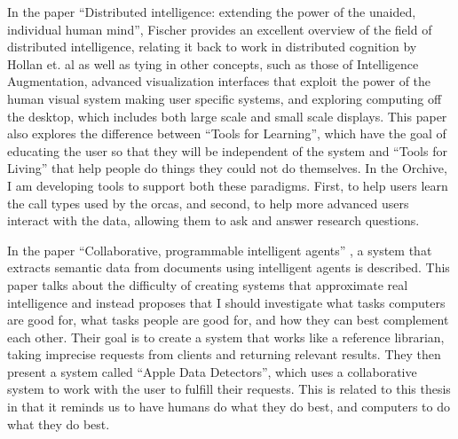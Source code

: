 \documentclass[12pt,oneside]{book}
\begin{document}
In the paper ``Distributed intelligence: extending the power of the
unaided, individual human mind'', \cite{fischer2006distributed}
Fischer provides an excellent overview of the field of distributed
intelligence, relating it back to work in distributed cognition by
Hollan et. al \cite{hollan2000distributed} as well as tying in other
concepts, such as those of Intelligence Augmentation, advanced
visualization interfaces that exploit the power of the human visual
system making user specific systems, and exploring computing off the
desktop, which includes both large scale and small scale displays.
This paper also explores the difference between ``Tools for
Learning'', which have the goal of educating the user so that they
will be independent of the system and ``Tools for Living'' that help
people do things they could not do themselves.  In the Orchive, I am
developing tools to support both these paradigms.  First, to help
users learn the call types used by the orcas, and second, to help more
advanced users interact with the data, allowing them to ask and answer
research questions.

In the paper ``Collaborative, programmable intelligent agents''
\cite{nardi1998collaborative}, a system that extracts semantic data
from documents using intelligent agents is described.  This paper
talks about the difficulty of creating systems that approximate real
intelligence and instead proposes that I should investigate what
tasks computers are good for, what tasks people are good for, and how
they can best complement each other.  Their goal is to create a system
that works like a reference librarian, taking imprecise requests from
clients and returning relevant results.  They then present a system
called ``Apple Data Detectors'', which uses a collaborative system to
work with the user to fulfill their requests.  This is related to this
thesis in that it reminds us to have humans do what they do best, and
computers to do what they do best.
\end{document}
